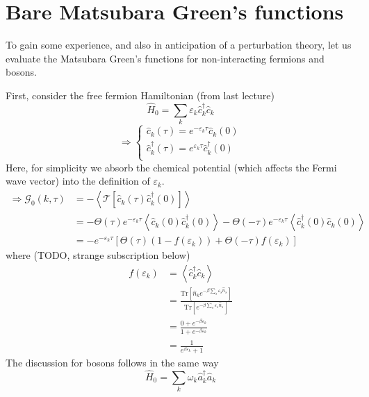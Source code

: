 \section{Bare Matsubara Green's functions}

To gain some experience, and also in anticipation of a perturbation theory, let us evaluate the Matsubara Green's functions for non-interacting fermions and bosons.

First, consider the free fermion Hamiltonian (from last lecture)
\[ \hat{H}_0=\sum_k{\varepsilon _k\hat{c}_{k}^{\dagger}\hat{c}_k}\]
\[ \Rightarrow \begin{cases}
	\hat{c}_k\left( \tau \right) =e^{-\varepsilon _k\tau}\hat{c}_k\left( 0 \right)\\
	\hat{c}_{k}^{\dagger}\left( \tau \right) =e^{\varepsilon _k\tau}\hat{c}_{k}^{\dagger}\left( 0 \right)\\
\end{cases}\]
Here, for simplicity we absorb the chemical potential (which affects the Fermi wave vector) into the definition of $\varepsilon_k$.
\begin{align*}
    \Rightarrow \mathcal{G} _0\left( k,\tau \right) &=-\left< \mathcal{T} \left[ \hat{c}_k\left( \tau \right) \hat{c}_{k}^{\dagger}\left( 0 \right) \right] \right> \\
    &=-\Theta \left( \tau \right) e^{-\varepsilon _k\tau}\left< \hat{c}_k\left( 0 \right) \hat{c}_{k}^{\dagger}\left( 0 \right) \right> -\Theta \left( -\tau \right) e^{-\varepsilon _k\tau}\left< \hat{c}_{k}^{\dagger}\left( 0 \right) \hat{c}_k\left( 0 \right) \right> \\
    &=-e^{-\varepsilon _k\tau}\left[ \Theta \left( \tau \right) \left( 1-f\left( \varepsilon _k \right) \right) +\Theta \left( -\tau \right) f\left( \varepsilon _k \right) \right]
\end{align*}
where (TODO, strange subscription below)
\begin{align*}
    f\left( \varepsilon _k \right) &=\left< \hat{c}_{k}^{\dagger}\hat{c}_k \right> \\
    &=\frac{\mathrm{Tr}\left[ \hat{n}_ke^{-\beta \sum_s{\varepsilon _s\hat{n}_s}} \right]}{\mathrm{Tr}\left[ e^{-\beta \sum_s{\varepsilon _s\hat{n}_s}} \right]}\\
    &=\frac{0+e^{-\beta \varepsilon _k}}{1+e^{-\beta \varepsilon _k}}\\
    &=\frac{1}{e^{\beta \varepsilon _k}+1}
\end{align*}
The discussion for bosons follows in the same way
\[ \hat{H}_0=\sum_k{\omega _k\hat{a}_{k}^{\dagger}\hat{a}_k}\]
